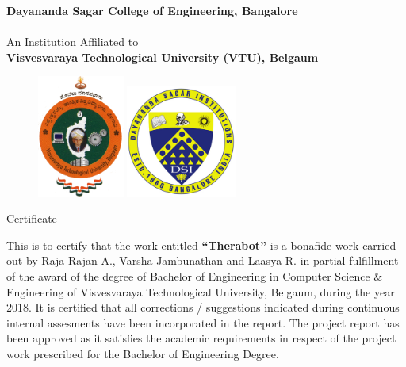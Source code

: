 \thispagestyle{empty}

\setlength{\toptafiddle}{1in}
\setlength{\bottafiddle}{1in}

\vspace*{-0.75in}
\enlargethispage{\toptafiddle}

\begin{center}
\textbf{Dayananda Sagar College of Engineering, Bangalore}\\
\hspace{0.1cm}\\
An Institution Affiliated to\\
\textbf{Visvesvaraya Technological University (VTU), Belgaum}\\
\vspace{0.2cm}

\begin{figure}[h]
    \centering
    \includegraphics[height=4cm]{images/vtu.png}
    \hspace{0.1\textwidth}
    \includegraphics[height=3.7cm]{images/dsi.png}
\end{figure}

\Huge{Certificate}
\end{center}

This is to certify that the work entitled \textbf{``Therabot''} is a bonafide work carried out by Raja Rajan A., Varsha Jambunathan and Laasya R. in partial fulfillment of the award of the degree of Bachelor of Engineering in Computer Science \& Engineering of Visvesvaraya Technological University, Belgaum, during the year 2018. It is certified that all corrections / suggestions indicated during continuous internal assesments have been incorporated in the report. The project report has been approved as it satisfies the academic requirements in respect of the project work prescribed for the Bachelor of Engineering Degree.

